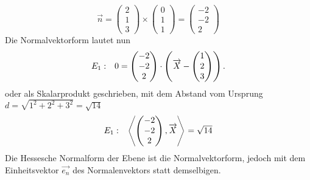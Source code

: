 \begin{equation*}
	\vec{n} =\begin{pmatrix}
		2\\
		1\\
		3
	\end{pmatrix} \times \begin{pmatrix}
		0\\
		1\\
		1
	\end{pmatrix} =\begin{pmatrix}
		-2\\
		-2\\
		2
	\end{pmatrix}
\end{equation*}
Die Normalvektorform lautet nun
\begin{equation*}
	\begin{array}{ r l }
		E_{1} : & 0=\begin{pmatrix}
			-2\\
			-2\\
			2
		\end{pmatrix} \cdotp \left(\vec{X} -\begin{pmatrix}
			1\\
			2\\
			3
		\end{pmatrix}\right)\text{.}
	\end{array}
\end{equation*}
oder als Skalarprodukt geschrieben, mit dem Abstand vom Ursprung $\displaystyle d=\sqrt{1^{2} +2^{2} +3^{2}} =\sqrt{14}$
\begin{equation*}
	\begin{array}{ r l }
		E_{1} : & \left< \begin{pmatrix}
			-2\\
			-2\\
			2
		\end{pmatrix} ,\vec{X}\right> =\sqrt{14}
	\end{array}
\end{equation*}
Die Hessesche Normalform der Ebene ist die Normalvektorform, jedoch mit dem Einheitsvektor $\displaystyle \overrightarrow{e_{n}}$ des Normalenvektors statt demselbigen.

